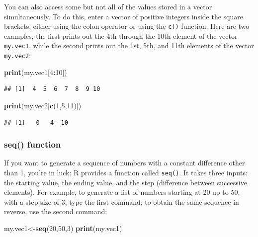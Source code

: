 \documentclass[
]{book}
\newenvironment{Shaded}{\begin{snugshade}}{\end{snugshade}}
\newcommand{\DecValTok}[1]{\textcolor[rgb]{0.00,0.00,0.81}{#1}}
\newcommand{\KeywordTok}[1]{\textcolor[rgb]{0.13,0.29,0.53}{\textbf{#1}}}
\newcommand{\NormalTok}[1]{#1}
\newcommand{\OperatorTok}[1]{\textcolor[rgb]{0.81,0.36,0.00}{\textbf{#1}}}
\begin{document}
You can also access some but not all of the values stored in a vector simultaneously. To do this, enter a vector of positive integers inside the square brackets, either using the colon operator or using the \texttt{c()} function. Here are two examples, the first prints out the 4th through the 10th element of the vector \texttt{my.vec1}, while the second prints out the 1st, 5th, and 11th elements of the vector \texttt{my.vec2}:

\begin{Shaded}
\begin{Highlighting}[]
\KeywordTok{print}\NormalTok{(my.vec1[}\DecValTok{4}\OperatorTok{:}\DecValTok{10}\NormalTok{])}
\end{Highlighting}
\end{Shaded}

\begin{verbatim}
## [1]  4  5  6  7  8  9 10
\end{verbatim}

\begin{Shaded}
\begin{Highlighting}[]
\KeywordTok{print}\NormalTok{(my.vec2[}\KeywordTok{c}\NormalTok{(}\DecValTok{1}\NormalTok{,}\DecValTok{5}\NormalTok{,}\DecValTok{11}\NormalTok{)])}
\end{Highlighting}
\end{Shaded}

\begin{verbatim}
## [1]   0  -4 -10
\end{verbatim}

\hypertarget{seq-function}{%
\subsubsection{seq() function}\label{seq-function}}

If you want to generate a sequence of numbers with a constant difference other than 1, you're in luck: R provides a function called \texttt{seq()}. It takes three inputs: the starting value, the ending value, and the step (difference between successive elements). For example, to generate a list of numbers starting at 20 up to 50, with a step size of 3, type the first command; to obtain the same sequence in reverse, use the second command:

\begin{Shaded}
\begin{Highlighting}[]
\NormalTok{my.vec1\textless{}{-}}\KeywordTok{seq}\NormalTok{(}\DecValTok{20}\NormalTok{,}\DecValTok{50}\NormalTok{,}\DecValTok{3}\NormalTok{)}
\KeywordTok{print}\NormalTok{(my.vec1)}
\end{Highlighting}
\end{Shaded}
\end{document}
